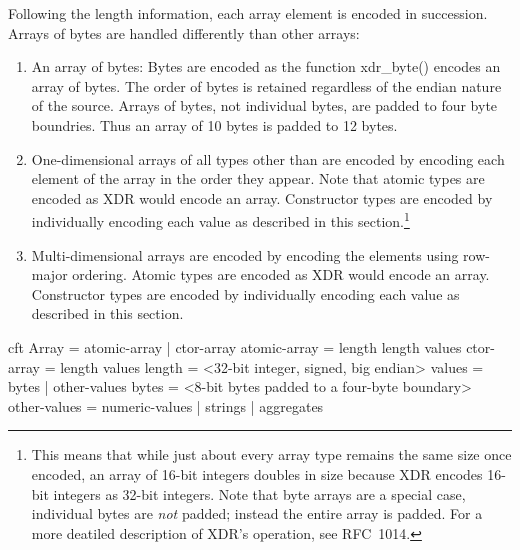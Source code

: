 \documentclass[justify]{nasa-ese}
\begin{document}
  Following the length information, each array element is encoded in
  succession. Arrays of bytes are handled differently than other arrays:
\begin{enumerate}
\item An array of bytes: Bytes are encoded as the function xdr\_byte()
  encodes an array of bytes. The order of bytes is retained regardless
  of the endian nature of the source. Arrays of bytes, not individual
  bytes, are padded to four byte boundries. Thus an array of 10 bytes
  is padded to 12 bytes.
  
\item One-dimensional arrays of all types other than  are
  encoded by encoding each element of the array in the order they
  appear. Note that atomic types are encoded as XDR would encode an
  array. Constructor types are encoded by individually encoding each
  value as described in this section.\footnote{This means that while
    just about every array type remains the same size once encoded,
    an array of 16-bit integers doubles in size because XDR encodes
    16-bit integers as 32-bit integers. Note that byte arrays are a
    special case, individual bytes are {\it not} padded; instead the
    entire array is padded. For a more deatiled description of XDR's
    operation, see RFC~1014\cite{xdr}.}

\item Multi-dimensional arrays are encoded by encoding the elements
  using row-major ordering. Atomic types are encoded as XDR would
  encode an array. Constructor types are encoded by individually
  encoding each value as described in this section.

\end{enumerate}

\begin{vcode}{cft}
Array        = atomic-array | ctor-array
atomic-array = length length values 
ctor-array   = length values 
length       = <32-bit integer, signed, big endian> 
values       = bytes | other-values 
bytes        = <8-bit bytes padded to a four-byte boundary> 
other-values = numeric-values | strings | aggregates 
\end{vcode}

\end{document}
